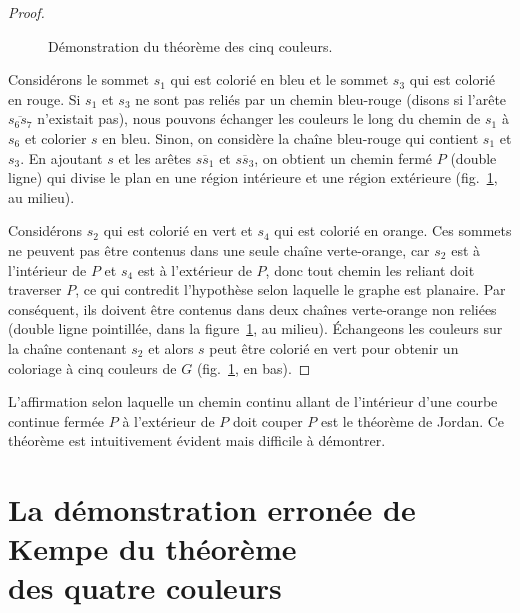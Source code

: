 \begin{proof}
\begin{figure}[htbp]
\caption{Démonstration du théorème des cinq couleurs.}
\label{f.five-color-proof}
\end{figure}



Considérons le sommet $s_1$ qui est colorié en bleu et le sommet $s_3$ qui est colorié en rouge. Si $s_1$ et $s_3$ ne sont pas reliés par un chemin bleu-rouge (disons si l'arête $\overline{s_6s_7}$ n'existait pas), nous pouvons échanger les couleurs le long du chemin de $s_1$ à $s_6$ et colorier $s$ en bleu. Sinon, on considère la chaîne bleu-rouge qui contient $s_1$ et $s_3$. En ajoutant $s$ et les arêtes $\overline{ss_1}$ et $\overline{ss_3}$, on obtient un chemin fermé $P$ (double ligne) qui divise le plan en une région \og intérieure\fg{} et une région \og extérieure\fg{}  (fig.~\ref{f.five-color-proof}, au milieu).

Considérons $s_2$ qui est colorié en vert et $s_4$ qui est colorié en orange. Ces sommets ne peuvent pas être contenus dans une seule chaîne verte-orange, car $s_2$ est à l'intérieur de $P$ et $s_4$ est à l'extérieur de $P$, donc tout chemin les reliant doit traverser $P$, ce qui contredit l'hypothèse selon laquelle le graphe est planaire. Par conséquent, ils doivent être contenus dans deux chaînes verte-orange non reliées (double ligne pointillée, dans la figure~\ref{f.five-color-proof}, au milieu).
Échangeons les couleurs sur la chaîne contenant $s_2$ et alors $s$ peut être colorié en vert pour obtenir un coloriage à cinq couleurs de $G$ (fig.~\ref{f.five-color-proof}, en bas).
\end{proof}

\begin{advanced}
L'affirmation selon laquelle un chemin continu allant de l'intérieur d'une courbe continue fermée $P$ à l'extérieur de $P$ doit couper $P$ est le 
 théorème de Jordan. Ce théorème est intuitivement évident mais difficile à démontrer.
\end{advanced}

\section[La démonstration erronée de Kempe du théorème des quatre couleurs]{La démonstration erronée de Kempe du théorème\\ des quatre couleurs}\label{s.kempe}

